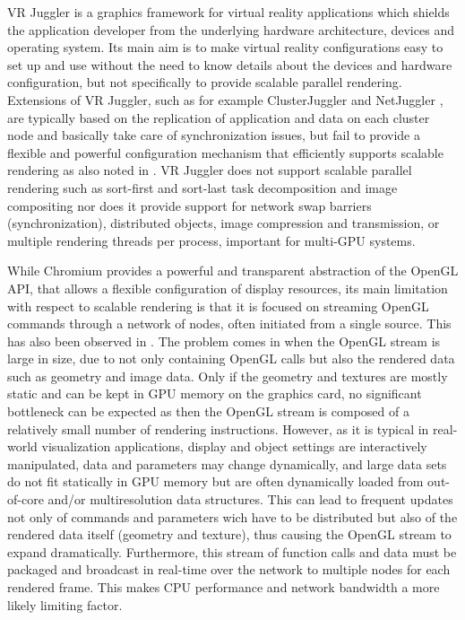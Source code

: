 VR Juggler \cite{BJHMBC:01,JBBC:98} is a graphics framework for virtual reality
applications which shields the application developer from the underlying
hardware architecture, devices and operating system. Its main aim is to make
virtual reality configurations easy to set up and use without the need to know
details about the devices and hardware configuration, but not specifically to
provide scalable parallel rendering. Extensions of VR Juggler, such as for
example ClusterJuggler \cite{BC:03} and NetJuggler \cite{AGLMR:02}, are
typically based on the replication of application and data on each cluster node
and basically take care of synchronization issues, but fail to provide a
flexible and powerful configuration mechanism that efficiently supports scalable
rendering as also noted in \cite{SWNH:03}. VR Juggler does not support scalable
parallel rendering such as sort-first and sort-last task decomposition and image
compositing nor does it provide support for network swap barriers
(synchronization), distributed objects, image compression and transmission, or
multiple rendering threads per process, important for multi-GPU systems.

While Chromium \cite{HHNFAKK:02} provides a powerful and transparent abstraction
of the OpenGL API, that allows a flexible configuration of display resources,
its main limitation with respect to scalable rendering is that it is focused on
streaming OpenGL commands through a network of nodes, often initiated from a
single source. This has also been observed in \cite{SWNH:03}. The problem comes
in when the OpenGL stream is large in size, due to not only containing OpenGL
calls but also the rendered data such as geometry and image data. Only if the
geometry and textures are mostly static and can be kept in GPU memory on the
graphics card, no significant bottleneck can be expected as then the OpenGL
stream is composed of a relatively small number of rendering instructions.
However, as it is typical in real-world visualization applications, display and
object settings are interactively manipulated, data and parameters may change
dynamically, and large data sets do not fit statically in GPU memory but are
often dynamically loaded from out-of-core and/or multiresolution data
structures. This can lead to frequent updates not only of commands and
parameters wich have to be distributed but also of the rendered data itself
(geometry and texture), thus causing the OpenGL stream to expand dramatically.
Furthermore, this stream of function calls and data must be packaged and
broadcast in real-time over the network to multiple nodes for each rendered
frame. This makes CPU performance and network bandwidth a more likely limiting
factor.

